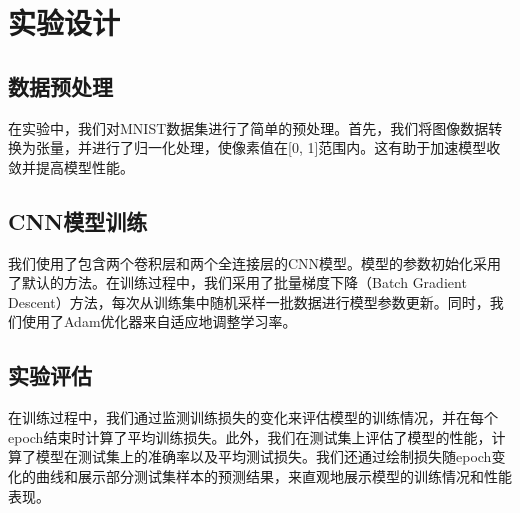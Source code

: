 \section{实验设计}\label{sec:design}

\subsection{数据预处理}

在实验中，我们对MNIST数据集进行了简单的预处理。首先，我们将图像数据转换为张量，并进行了归一化处理，使像素值在[0, 1]范围内。这有助于加速模型收敛并提高模型性能。

\subsection{CNN模型训练}

我们使用了包含两个卷积层和两个全连接层的CNN模型。模型的参数初始化采用了默认的方法。在训练过程中，我们采用了批量梯度下降（Batch Gradient Descent）方法，每次从训练集中随机采样一批数据进行模型参数更新。同时，我们使用了Adam优化器来自适应地调整学习率。

\subsection{实验评估}

在训练过程中，我们通过监测训练损失的变化来评估模型的训练情况，并在每个epoch结束时计算了平均训练损失。此外，我们在测试集上评估了模型的性能，计算了模型在测试集上的准确率以及平均测试损失。我们还通过绘制损失随epoch变化的曲线和展示部分测试集样本的预测结果，来直观地展示模型的训练情况和性能表现。